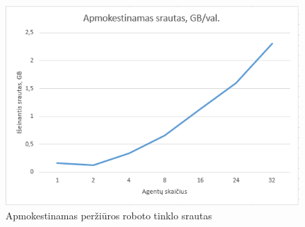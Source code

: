 \begin{figure}[htp!]
\centering
\includegraphics[scale=1.2]{img/apmokestinamas_srautas.png}
\caption{Apmokestinamas peržiūros roboto tinklo srautas}
\label{fig:egress_traffic_experimnent_result}
\end{figure}
